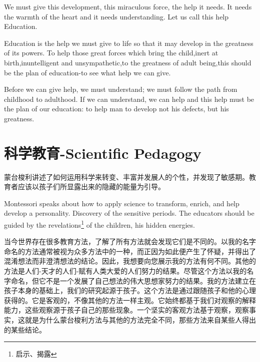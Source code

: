 \documentclass[lang=cn,10pt]{elegantbook}
\begin{document}
We must give this development, this miraculous force, the help it needs. It needs the warmth of the heart and it needs understanding. Let us call this help Education.

Education is the help we must give to life so that it may develop in the greatness of its powers. To help those great forces which bring the child,inert at birth,inuntelligent and unsympathetic,to the greatness of adult being,this should be the plan of education-to see what help we can give.

Before we can give help, we must understand; we must follow the path from childhood to adulthood. If we can understand, we can help and this help must be the plan of our education: to help man to develop not his defects, but his greatness.

\chapter{科学教育-Scientific Pedagogy}

蒙台梭利讲述了如何运用科学来转变、丰富并发展人的个性，并发现了敏感期。教育者应该以孩子们所显露出来的隐藏的能量为引导。

Montessori speaks about how to apply science to transform, enrich, and help develop a personality. Discovery of the sensitive periods. The educators should be guided by the revelations\footnote{启示、揭露} of the children, his hidden energies.

当今世界存在很多教育方法，了解了所有方法就会发现它们是不同的。以我的名字命名的方法通常被视为众多方法中的一种，而正因为如此便产生了怀疑，并得出了混淆想法而非澄清想法的结论。因此，我想要向您展示我的方法有何不同。其他的方法是人们-天才的人们-赋有人类大爱的人们努力的结果。尽管这个方法以我的名字命名，但它不是一个发展了自己想法的伟大思想家努力的结果。我的方法建立在孩子本身的基础上，我们的研究起源于孩子。这个方法是通过跟随孩子和他的心理获得的。它是客观的，不像其他的方法一样主观。它始终都基于我们对观察的解释能力，这些观察源于孩子自己的那些现象。一个坚实的客观方法基于观察，观察事实，这就是为什么蒙台梭利方法与其他的方法完全不同，那些方法来自某些人得出的某些结论。
\end{document}

